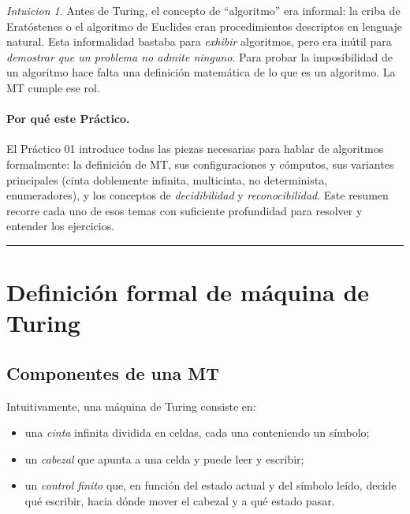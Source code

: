 \documentclass[11pt,a4paper]{article}
\theoremstyle{plain}
\theoremstyle{definition}
\theoremstyle{remark}
\newtheorem*{intuicion}{Intuicion}
\begin{document}
\begin{intuicion}
Antes de Turing, el concepto de ``algoritmo'' era informal: la criba de
Erat\'ostenes o el algoritmo de Euclides eran procedimientos descriptos en
lenguaje natural. Esta informalidad bastaba para \emph{exhibir} algoritmos,
pero era in\'util para \emph{demostrar que un problema no admite ninguno}.
Para probar la imposibilidad de un algoritmo hace falta una definici\'on
matem\'atica de lo que es un algoritmo. La MT cumple ese rol.
\end{intuicion}

\paragraph{Por qu\'e este Pr\'actico.} El Pr\'actico 01 introduce todas las
piezas necesarias para hablar de algoritmos formalmente: la definici\'on de
MT, sus configuraciones y c\'omputos, sus variantes principales (cinta
doblemente infinita, multicinta, no determinista, enumeradores), y los
conceptos de \emph{decidibilidad} y \emph{reconocibilidad}. Este resumen
recorre cada uno de esos temas con suficiente profundidad para resolver y
entender los ejercicios.

\bigskip\hrule\bigskip

\section{Definici\'on formal de m\'aquina de Turing}
\label{sec:formal}

\subsection{Componentes de una MT}

Intuitivamente, una m\'aquina de Turing consiste en:

\begin{itemize}
  \item una \emph{cinta} infinita dividida en celdas, cada una conteniendo
        un s\'imbolo;
  \item un \emph{cabezal} que apunta a una celda y puede leer y escribir;
  \item un \emph{control finito} que, en funci\'on del estado actual y del
        s\'imbolo le\'ido, decide qu\'e escribir, hacia d\'onde mover el
        cabezal y a qu\'e estado pasar.
\end{itemize}
\end{document}
